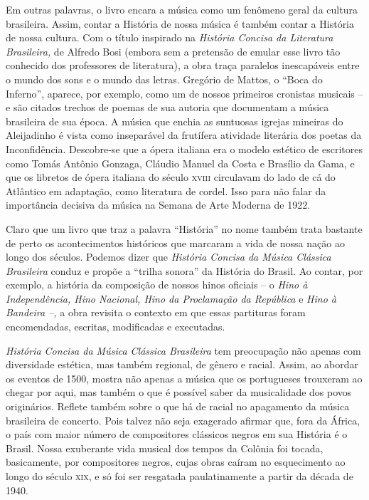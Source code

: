 \documentclass[11pt]{extarticle}
\begin{document}
Em outras palavras, o livro encara a música como um fenômeno geral da
cultura brasileira. Assim, contar a História de nossa música é também
contar a História de nossa cultura. Com o título inspirado na
\emph{História Concisa da Literatura Brasileira,} de Alfredo Bosi
(embora sem a pretensão de emular esse livro tão conhecido dos
professores de literatura), a obra traça paralelos inescapáveis entre o
mundo dos sons e o mundo das letras. Gregório de Mattos, o ``Boca do
Inferno'', aparece, por exemplo, como um de nossos primeiros cronistas
musicais -- e são citados trechos de poemas de sua autoria que
documentam a música brasileira de sua época. A música que enchia as
suntuosas igrejas mineiras do Aleijadinho é vista como inseparável da
frutífera atividade literária dos poetas da Inconfidência. Descobre-se
que a ópera italiana era o modelo estético de escritores como Tomás
Antônio Gonzaga, Cláudio Manuel da Costa e Brasílio da Gama, e que os
libretos de ópera italiana do século \textsc{xviii} circulavam do lado de cá do
Atlântico em adaptação, como literatura de cordel. Isso para não falar
da importância decisiva da música na Semana de Arte Moderna de 1922.

Claro que um livro que traz a palavra ``História'' no nome também trata
bastante de perto os acontecimentos históricos que marcaram a vida de
nossa nação ao longo dos séculos. Podemos dizer que \emph{História
Concisa da Música Clássica Brasileira} conduz e propõe a ``trilha
sonora'' da História do Brasil. Ao contar, por exemplo, a história da
composição de nossos hinos oficiais -- o \emph{Hino à Independência,
Hino Nacional, Hino da Proclamação da República} e \emph{Hino à Bandeira
--,} a obra revisita o contexto em que essas partituras foram
encomendadas, escritas, modificadas e executadas.

\emph{História Concisa da Música Clássica Brasileira} tem preocupação
não apenas com diversidade estética, mas também regional, de gênero e
racial. Assim, ao abordar os eventos de 1500, mostra não apenas a música
que os portugueses trouxeram ao chegar por aqui, mas também o que é
possível saber da musicalidade dos povos originários. Reflete também
sobre o que há de racial no apagamento da música brasileira de concerto.
Pois talvez não seja exagerado afirmar que, fora da África, o país com
maior número de compositores clássicos negros em sua História é o
Brasil. Nossa exuberante vida musical dos tempos da Colônia foi tocada,
basicamente, por compositores negros, cujas obras caíram no esquecimento
ao longo do século \textsc{xix}, e só foi ser resgatada paulatinamente a partir
da década de 1940.
\end{document}
